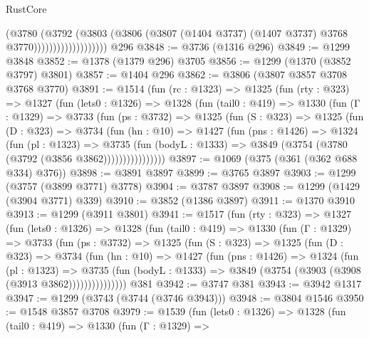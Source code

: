 \begin{lexlean}{RustCore}
\begin{coremodule}
                                (@3780
                                  (@3792
                                    (@3803
                                      (@3806
                                        (@3807
                                          (@1404 @3737)
                                          (@1407 @3737)
                                          @3768
                                          @3770)))))))))))))))))))
    @296
@3848 := @3736 (@1316 @296)
@3849 := @1299 @3848
@3852 := @1378 (@1379 @296) @3705
@3856 := @1299 (@1370 (@3852 @3797) @3801)
@3857 := @1404 @296
@3862 := @3806 (@3807 @3857 @3708 @3768 @3770)
@3891 := @1514
    (fun (rc : @1323) =>
    @1325
      (fun (rty : @323) =>
      @1327
        (fun (lets0 : @1326) =>
        @1328
          (fun (tail0 : @419) =>
          @1330
            (fun (Γ : @1329) =>
            @3733
              (fun (ps : @3732) =>
              @1325
                (fun (S : @323) =>
                @1325
                  (fun (D : @323) =>
                  @3734
                    (fun (hn : @10) =>
                    @1427
                      (fun (pns : @1426) =>
                      @1324
                        (fun (pl : @1323) =>
                        @3735
                          (fun (bodyL : @1333) =>
                          @3849 (@3754 (@3780 (@3792 (@3856 @3862))))))))))))))))
@3897 := @1069 (@375 (@361 (@362 @688 @334) @376))
@3898 := @3891 @3897
@3899 := @3765 @3897
@3903 := @1299 (@3757 (@3899 @3771) @3778)
@3904 := @3787 @3897
@3908 := @1299 (@1429 (@3904 @3771) @339)
@3910 := @3852 (@1386 @3897)
@3911 := @1370 @3910
@3913 := @1299 (@3911 @3801)
@3941 := @1517
    (fun (rty : @323) =>
    @1327
      (fun (lets0 : @1326) =>
      @1328
        (fun (tail0 : @419) =>
        @1330
          (fun (Γ : @1329) =>
          @3733
            (fun (ps : @3732) =>
            @1325
              (fun (S : @323) =>
              @1325
                (fun (D : @323) =>
                @3734
                  (fun (hn : @10) =>
                  @1427
                    (fun (pns : @1426) =>
                    @1324
                      (fun (pl : @1323) =>
                      @3735
                        (fun (bodyL : @1333) =>
                        @3849 (@3754 (@3903 (@3908 (@3913 @3862)))))))))))))))
    @381
@3942 := @3747 @381
@3943 := @3942 @1317
@3947 := @1299 (@3743 (@3744 (@3746 @3943)))
@3948 := @3804 @1546
@3950 := @1548 @3857 @3708
@3979 := @1539
    (fun (lets0 : @1326) =>
    @1328
      (fun (tail0 : @419) =>
      @1330
        (fun (Γ : @1329) =>

\end{coremodule}
\end{lexlean}
